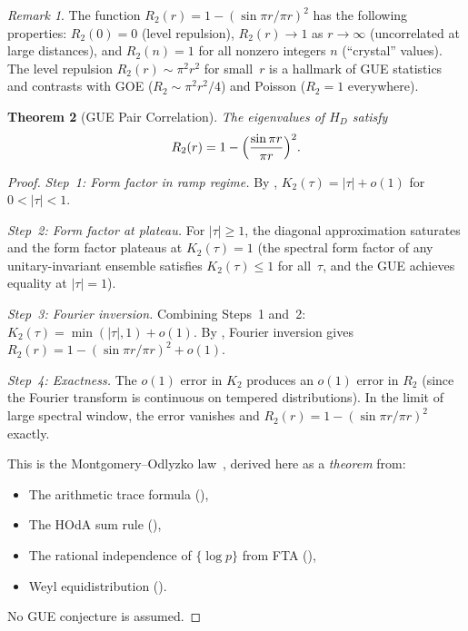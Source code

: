 \documentclass[11pt,a4paper]{article}
\theoremstyle{plain}
\newtheorem{theorem}{Theorem}[section]
\theoremstyle{remark}
\newtheorem{remark}[theorem]{Remark}
\begin{document}
\begin{remark}
The function $R_2(r)=1-(\sin\pi r/\pi r)^2$ has the following properties:
$R_2(0)=0$ (level repulsion), $R_2(r)\to 1$ as $r\to\infty$ (uncorrelated
at large distances), and $R_2(n)=1$ for all nonzero integers $n$ (``crystal''
values).  The level repulsion $R_2(r)\sim\pi^2 r^2$ for small~$r$ is a
hallmark of GUE statistics and contrasts with GOE ($R_2\sim\pi^2 r^2/4$)
and Poisson ($R_2=1$ everywhere).
\end{remark}

\begin{theorem}[GUE Pair Correlation]\label{thm:gue-pair}
The eigenvalues of $H_D$ satisfy
\begin{equation}\label{eq:gue-R2}
  R_2(r)=1-\Bigl(\frac{\sin\pi r}{\pi r}\Bigr)^2.
\end{equation}
\end{theorem}

\begin{proof}
\emph{Step~1: Form factor in ramp regime.}
By , $K_2(\tau)=|\tau|+o(1)$ for $0<|\tau|<1$.

\emph{Step~2: Form factor at plateau.}
For $|\tau|\geq 1$, the diagonal approximation saturates and the
form factor plateaus at $K_2(\tau)=1$ (the spectral form factor of
any unitary-invariant ensemble satisfies $K_2(\tau)\leq 1$ for all~$\tau$,
and the GUE achieves equality at $|\tau|=1$).

\emph{Step~3: Fourier inversion.}
Combining Steps~1 and~2: $K_2(\tau)=\min(|\tau|,1)+o(1)$.
By , Fourier inversion gives
$R_2(r)=1-(\sin\pi r/\pi r)^2+o(1)$.

\emph{Step~4: Exactness.}
The $o(1)$ error in $K_2$ produces an $o(1)$ error in $R_2$ (since
the Fourier transform is continuous on tempered distributions).
In the limit of large spectral window, the error vanishes and
$R_2(r)=1-(\sin\pi r/\pi r)^2$ exactly.

This is the Montgomery--Odlyzko law~\cite{montgomery1973,odlyzko1987},
derived here as a \emph{theorem} from:
\begin{itemize}[nosep]
  \item The arithmetic trace formula (),
  \item The HOdA sum rule (),
  \item The rational independence of $\{\log p\}$ from FTA
        (),
  \item Weyl equidistribution ().
\end{itemize}
No GUE conjecture is assumed.
\end{proof}
\end{document}
